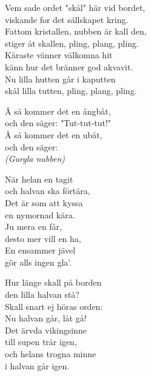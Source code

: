 \documentclass[a6paper, 10pt, twoside]{article}
\begin{document}
\newpage
\noindent
\begin{center}
\end{center}
\begin{lyrics}
Vem sade ordet "skål" här vid bordet,\\
viskande for det sällskapet kring.\\
Fattom kristallen, nubben är kall den,\\
stiger åt skallen, pling, plang, pling.\\
Käraste vänner välkomna hit\\
känn hur det bränner god akvavit.\\
Nu lilla hutten går i kaputten\\
skål lilla tutten, pling, plang, pling.
\end{lyrics}
\vspace{60pt}
\begin{center}
\end{center}
\begin{lyrics}
Å så kommer det en ångbåt, \\
och den säger: "Tut-tut-tut!" \\
Å så kommer det en ubåt, \\
och den säger: \\
\textit{(Gurgla nubben) }
\end{lyrics}

\noindent
\begin{center}
\end{center}
\begin{lyrics}
När helan en tagit \\
och halvan ska förtära, \\
Det är som att kyssa \\
en nymornad kära. 
\vspace{5pt} \\
Ju mera en får, \\
desto mer vill en ha, \\
En ensammer jävel \\
gör alls ingen gla'. 
\end{lyrics}
\vspace{60pt}
\begin{center}
\end{center}
\begin{lyrics}
Hur länge skall på borden\\ 
den lilla halvan stå? \\
Skall snart ej höras orden: \\
Nu halvan går, låt gå!
\vspace{5pt} \\
Det ärvda vikingsinne \\
till supen trår igen, \\
och helans trogna minne \\
i halvan går igen.
\end{lyrics}
\end{document}
